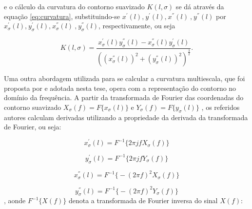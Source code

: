 e o cálculo da curvatura do contorno suavizado $K(l,\sigma)$ se dá através da equação \ref{eq:curvatura}, substituindo-se $x^{'}(l)\text{,}\:y^{'}(l)\text{,}\:x^{''}(l)\:\text{,}\:y^{''}(l)$ por $x^{'}_{\sigma}(l)\text{,}\:y^{'}_{\sigma}(l)\text{,}\:x^{''}_{\sigma}(l)\:\text{,}\:y^{''}_{\sigma}(l)$, respectivamente, ou seja

\begin{equation} \label{eq:curvatura_ms}
K(l,\sigma) = \frac{x_{\sigma}^{'}(l)y_{\sigma}^{''}(l)-x_{\sigma}^{''}(l)y_{\sigma}^{'}(l)}{((x_{\sigma}^{''}(l))^{2}+(y_{\sigma}^{''}(l))^{2})^{\frac{3}{2}}}\text{.}
\end{equation}

Uma outra abordagem utilizada para se calcular a curvatura multiescala, que foi proposta por  e adotada nesta tese, opera com a representação do contorno no domínio da frequência. A partir da transformada de Fourier das coordenadas do contorno suavizado $X_{\sigma}(f) = F\big\{x_{\sigma}(l)\big\}$ e $Y_{\sigma}(f) = F\big\{y_{\sigma}(l)\big\}$ , os referidos autores calculam derivadas utilizando a propriedade da derivada da transformada de Fourier, ou seja:

\begin{equation}
x_{\sigma}^{'}(l) = F^{-1}\big\{2 \pi j f  X_{\sigma}(f)\big\}
\end{equation}

\begin{equation}
y_{\sigma}^{'}(l) = F^{-1}\big\{2 \pi j f  Y_{\sigma}(f)\big\}
\end{equation}

\begin{equation}
x_{\sigma}^{''}(l) = F^{-1}\big\{- (2 \pi f)^2 X_{\sigma}(f)\big\}
\end{equation}

\begin{equation}
y_{\sigma}^{''}(l) = F^{-1}\big\{- (2 \pi f)^2 Y_{\sigma}(f)\big\}
\end{equation}, aonde $F^{-1}\big\{X(f)\big\}$ denota a transformada de Fourier inversa do sinal $X(f)$:

\begin{comment}
\begin{equation}
X(f) = F\big\{x(l)\big\} = \int\limits^\infty_\infty x(l)e^{-2 \pi j f l}dl
\end{equation}

\begin{equation}
x(l) = F^{-1}\big\{X(f)\big\} \int\limits^\infty_\infty X(f)e^{2 \pi j f l}df
\end{equation}
\end{comment}


